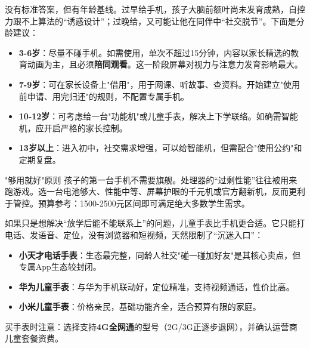 


没有标准答案，但有年龄基线。过早给手机，孩子大脑前额叶尚未发育成熟，自控力跟不上算法的“诱惑设计”；过晚给，又可能让他在同伴中“社交脱节”。下面是分龄建议：

\begin{itemize}
  \item \textbf{3-6岁}：尽量不碰手机。如需使用，单次不超过15分钟，内容以家长精选的教育动画为主，且必须\textbf{陪同观看}。这一阶段屏幕对视力与注意力发育影响最大。
  \item \textbf{7-9岁}：可在家长设备上"借用"，用于网课、听故事、查资料。开始建立"使用前申请、用完归还"的规则，不配置专属手机。
  \item \textbf{10-12岁}：可考虑给一台"功能机"或儿童手表，解决上下学联络。如确需智能机，应开启严格的家长控制。
  \item \textbf{13岁以上}：进入初中，社交需求增强，可以给智能机，但需配合"使用公约"和定期复盘。
\end{itemize}

\begin{tcbinfo}{"够用就好"原则}
孩子的第一台手机不需要旗舰。处理器的“过剩性能”往往被用来跑游戏。选一台电池够大、性能中等、屏幕护眼的千元机或官方翻新机，反而更利于管控。预算参考：1500-2500元区间即可满足绝大多数学生需求。

\end{tcbinfo}


如果只是想解决“放学后能不能联系上”的问题，儿童手表比手机更合适。它只能打电话、发语音、定位，没有浏览器和短视频，天然限制了“沉迷入口”：

\begin{itemize}
  \item \textbf{小天才电话手表}：生态最完整，同龄人社交"碰一碰加好友"是其核心卖点，但专属App生态较封闭。
  \item \textbf{华为儿童手表}：与华为手机联动好，定位精准，支持视频通话，性价比高。
  \item \textbf{小米儿童手表}：价格亲民，基础功能齐全，适合预算有限的家庭。
\end{itemize}

买手表时注意：选择支持\textbf{4G全网通}的型号（2G/3G正逐步退网），并确认运营商儿童套餐资费。

